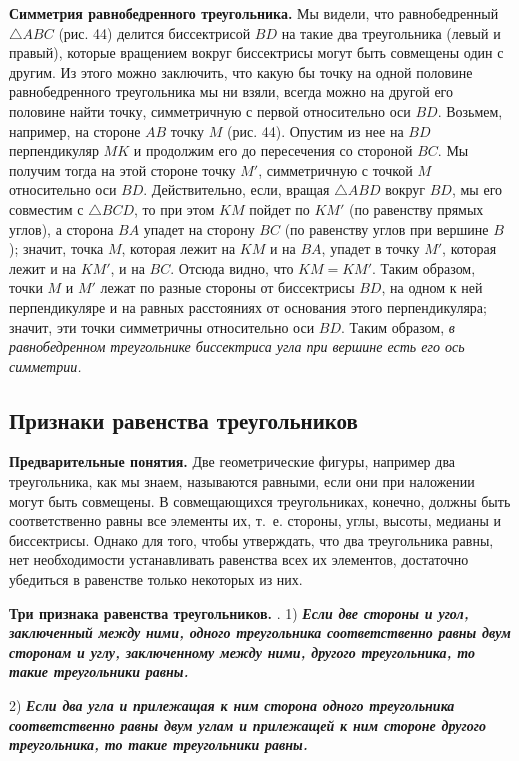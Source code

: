 \documentclass[oneside]{book}
\begin{document}
\textbf{Симметрия равнобедренного треугольника.}
Мы видели, что равнобедренный $\triangle ABC$ (рис. 44) делится биссектрисой $BD$ на такие два треугольника (левый и правый), которые вращением вокруг биссектрисы могут быть совмещены один с другим.
Из этого можно заключить, что какую бы точку на одной половине равнобедренного треугольника мы ни взяли, всегда можно на другой его половине найти точку, симметричную с первой относительно оси $BD$.
Возьмем, например, на стороне $AB$ точку $M$ (рис. 44).
Опустим из нее на $BD$ перпендикуляр $MK$ и продолжим его до пересечения со стороной $BC$.
Мы получим тогда на этой стороне точку $M'$, симметричную с точкой $M$ относительно оси $BD$.
Действительно, если, вращая $\triangle ABD$ вокруг $BD$, мы его совместим с $\triangle BCD$, то при этом $KM$ пойдет по $KM'$ (по равенству прямых углов), а сторона $BA$ упадет на сторону $BC$ (по равенству углов при вершине $B$);
значит, точка $M$, которая лежит на $KM$ и на $BA$, упадет в точку $M'$, которая лежит и на $KM'$, и на $BC$.
Отсюда видно, что $KM=KM'$.
Таким образом, точки $M$ и $M'$ лежат по разные стороны от биссектрисы $BD$, на одном к ней перпендикуляре и на равных расстояниях от основания этого перпендикуляра;
значит, эти точки симметричны относительно оси $BD$.
Таким образом, \emph{в равнобедренном треугольнике биссектриса угла при вершине есть его ось симметрии.}

\subsection*{Признаки равенства треугольников}

\textbf{Предварительные понятия.}
Две геометрические фигуры, например два треугольника, как мы знаем, называются равными, если они при наложении могут быть совмещены.
В совмещающихся треугольниках, конечно, должны быть соответственно равны все элементы их, т.~е. стороны, углы, высоты, медианы и биссектрисы.
Однако для того, чтобы утверждать, что два треугольника равны, нет необходимости устанавливать равенства всех их элементов, достаточно убедиться в равенстве только некоторых из них.

\textbf{Три признака равенства треугольников.}
.
1) \textbf{\emph{Если две стороны и угол, заключенный
между ними, одного треугольника соответственно равны
двум сторонам и углу, заключенному между ними, другого треугольника, то такие треугольники равны.}}

2) \textbf{\emph{Если два угла и прилежащая к ним сторона одного треугольника соответственно равны двум углам и прилежащей к ним стороне другого треугольника, то такие треугольники равны.}}
\end{document}
